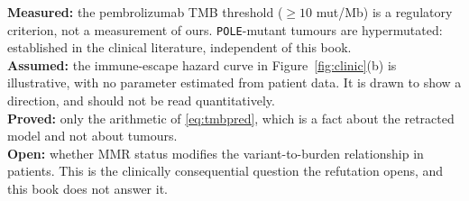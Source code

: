 \begin{ledger}
\textbf{Measured:} the pembrolizumab TMB threshold ($\ge 10$ mut/Mb) is a
regulatory criterion, not a measurement of ours. \texttt{POLE}-mutant tumours are
hypermutated: established in the clinical literature, independent of this book. \\
\textbf{Assumed:} the immune-escape hazard curve in Figure~\ref{fig:clinic}(b) is
illustrative, with no parameter estimated from patient data. It is drawn to show
a direction, and should not be read quantitatively. \\
\textbf{Proved:} only the arithmetic of \eqref{eq:tmbpred}, which is a fact about
the retracted model and not about tumours. \\
\textbf{Open:} whether MMR status modifies the variant-to-burden relationship in
patients. This is the clinically consequential question the refutation opens,
and this book does not answer it.
\end{ledger}
